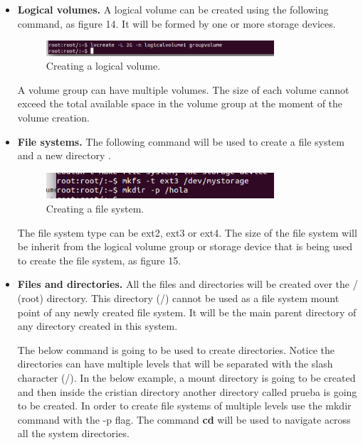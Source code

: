 \documentclass{aes2e}
\begin{document}
\begin{itemize}
\item \textbf{Logical volumes.}\newline
A logical volume can be created using the following command, as figure 14. It will be formed by one or more storage devices.
\begin{figure}[ht]
\centering
\includegraphics[width=20pc]{logical_volume.png}
\caption{Creating a logical volume.}
\end{figure}
A volume group can have multiple volumes. The size of each volume cannot exceed
the total available space in the volume group at the moment of the volume creation.\newline
\item \textbf{File systems.}\newline
The following command will be used to create a file system and a new directory .
\begin{figure}[ht]
\centering
\includegraphics[width=20pc]{file_system.png}
\caption{Creating a file system.}
\end{figure}
The file system type can
be ext2, ext3 or ext4. The size of the file system will be inherit from the logical volume
group or storage device that is being used to create the file system, as figure 15.\newline

\item \textbf{Files and directories.}\newline
All the files and directories will be created over the / (root) directory. This directory (/)
cannot be used as a file system mount point of any newly created file system. It will be
the main parent directory of any directory created in this system.\newline

The below command is going to be used to create directories. Notice the directories can have multiple levels that will be separated with the slash character (/). In the below
example, a mount directory is going to be created and then inside the cristian directory another directory called prueba is going to be created. In order to create file systems of multiple levels use the mkdir command with the -p flag.\newline
 The command \textbf{ cd}  will be used to navigate across all the system directories.\newline


\end{itemize}
\end{document}

